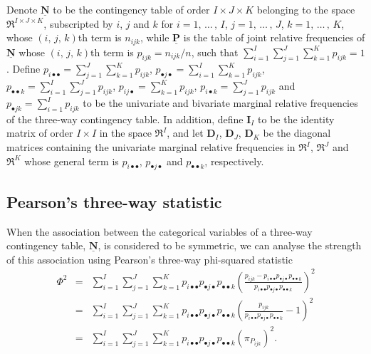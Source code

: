 Denote $\mathbf{\underline{N}}$ to be the contingency table of order ${I \times J \times K}$ belonging to the space $\Re^{ I\times J \times K}$, subscripted by $i$, $j$ and $k$ for $i=1,\, \ldots \,,\, I$, $j = 1,\, \ldots \,,\, J$, $k = 1,\, \ldots \,,\, K$,  whose $\left(i,\,j,\,k \right)$th term is $n_{ijk}$, while $\mathbf{ \underline{P}}$ is the table of joint relative frequencies of $\mathbf{\underline{N}}$ whose $\left(i,\,j,\,k \right)$th term is $p_{ijk} = n_{ijk} /n$, such that $\sum_{i=1}^I \sum_{j=1}^J \sum_{k=1}^K p_{ijk} = 1$. Define $p_{i\bullet \bullet} = \sum_{j=1}^J \sum_{k=1}^K p_{ijk}$, $p_{\bullet j  \bullet} = \sum_{i=1}^I \sum_{k=1}^K p_{ijk}$, $p_{\bullet \bullet k} = \sum_{i=1}^I \sum_{j=1}^J p_{ijk}$, $p_{ij \bullet} = \sum_{k=1}^K p_{ijk}$, $p_{i \bullet k} = \sum_{j=1}^J p_{ijk}$ and $p_{\bullet jk} = \sum_{i=1}^I p_{ijk}$ to be the univariate and bivariate marginal relative frequencies of the three-way contingency table. In addition, define $\mathbf{I}_I$ to be the identity matrix of order ${I\times I}$ in the space $\Re^I$, and let $\mathbf{ D}_I$, $\mathbf{D}_J$, $\mathbf{D}_K$ be the diagonal matrices containing the univariate marginal relative frequencies in $\Re^I$, $\Re^{ J}$ and $\Re^{ K}$ whose general term is $p_{i \bullet \bullet}$, $p_{\bullet j  \bullet}$ and $p_{\bullet \bullet k}$, respectively.

\subsection{Pearson's three-way statistic}

When the association between the categorical variables of a three-way contingency table, $\mathbf{\underline{N}}$, is considered to be symmetric, we can analyse the strength of this association using  Pearson's three-way phi-squared statistic 
\begin{eqnarray}
\label{phi}
\Phi^2 & = &\sum_{i=1}^I\sum_{j=1}^J\sum_{k=1}^K p_{i \bullet \bullet }p_{\bullet j\bullet }p_{\bullet \bullet k}\left ( \frac{p_{ijk }-p_{i\bullet \bullet }p_{\bullet j\bullet }p_{\bullet \bullet k}}{p_{i \bullet \bullet }p_{\bullet j\bullet }p_{\bullet \bullet k}} \right )^2\\
& = & \sum_{i=1}^I\sum_{j=1}^J\sum_{k=1}^K p_{i \bullet \bullet }p_{\bullet j\bullet }p_{\bullet \bullet k}\left( \frac{p_{ijk}} {p_{i \bullet \bullet }p_{\bullet j\bullet }p_{\bullet \bullet k}} -1 \right)^2  \nonumber \\
& = &\sum_{i=1}^I\sum_{j=1}^J\sum_{k=1}^K p_{i \bullet \bullet }p_{\bullet j\bullet }p_{\bullet \bullet k} \left(\pi_{P_{ijk}}\right)^2 . \nonumber
\end{eqnarray}

